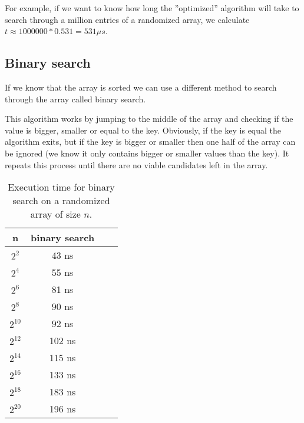 \documentclass[a4paper,11pt]{article}
\begin{document}
For example, if we want to know how long the ''optimized'' algorithm will take to search through a million entries of a randomized array, we calculate $t \approx 1000000 * 0.531 = 531 \mu s$.

\subsection*{Binary search}

If we know that the array is sorted we can use a different method to search through the array called binary search.

This algorithm works by jumping to the middle of the array and checking if the value is bigger, smaller or equal to the key.
Obviously, if the key is equal the algorithm exits, but if the key is bigger or smaller then one half of the array can be ignored (we know it only contains bigger or smaller values than the key). It repeats this process until there are no viable candidates left in the array.

\begin{table}[H]
\centering
\begin{tabular}{|c|c|c|c|}
\hline
\textbf{n} & \textbf{binary search} \\
\hline
	$2^{2}$ & 43 ns \\
	$2^{4}$ & 55 ns \\
	$2^{6}$ & 81 ns \\
	$2^{8}$ & 90 ns \\
	$2^{10}$ & 92 ns \\
	$2^{12}$ & 102 ns \\
	$2^{14}$ & 115 ns \\
	$2^{16}$ & 133 ns \\
	$2^{18}$ & 183 ns \\
	$2^{20}$ & 196 ns \\
\hline
\end{tabular}
\caption{Execution time for binary search on a randomized array of size $n$.}
\label{tab:table2}
\end{table}

\begin{table}[H]
\centering
{}
\end{table}
\end{document}
